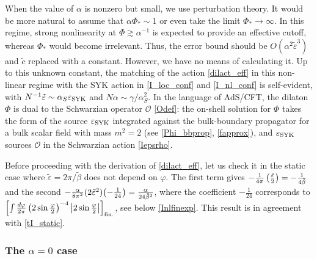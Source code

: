 \documentclass[12pt]{article}
\newcommand{\OO}{\mathcal{O}}
\newcommand{\al}{\alpha}
\newcommand{\ga}{\gamma}
\newcommand{\vep}{\varepsilon}
\newcommand{\tvep}{\tilde{\varepsilon}}
\newcommand{\vp}{\varphi}
\newcommand{\ov}{\over}
\begin{document}
When the value of $\alpha$ is nonzero but small, we use perturbation theory. It would be more natural to assume that $\alpha\Phi_*\sim 1$ or even take the limit $\Phi_*\to\infty$. In this regime, strong nonlinearity at $\Phi\gtrsim\alpha^{-1}$ is expected to provide an effective cutoff, whereas $\Phi_*$ would become irrelevant. Thus, the error bound should be $O(\alpha^{2}\tvep^3)$ and $\tilde{c}$ replaced with a constant. However, we have no means of calculating it. Up to this unknown constant, the matching of the action \eqref{dilact_eff} in this non-linear regime with the SYK action in \eqref{I_loc_conf} and \eqref{I_nl_conf} is self-evident, with $N^{-1}\tvep \sim \al_S \vep_{\rm{SYK}}$ and $N \al \sim \ga/\al_S^2$. In the language of AdS/CFT, the dilaton $\Phi$ is dual to the Schwarzian operator $\OO$ \eqref{Odef}: the on-shell solution for $\Phi$ takes the form of the source $\vep_{\rm{SYK}}$ integrated against the bulk-boundary propagator for a bulk scalar field with mass $m^2=2$ (see \eqref{Phi_bbprop}, \eqref{fapprox}), and $\vep_{\rm{SYK}}$ sources $\OO$ in the Schwarzian action \eqref{Iepsrho}. 

Before proceeding with the derivation of \eqref{dilact_eff}, let us check it in the static case where $\tvep=2\pi/\tilde{\beta}$ does not depend on $\vp$. The first term gives $-\frac{1}{4\pi}\left({\tvep \ov 2}\right)=-{1 \ov 4\tilde{\beta}}$ and the second $-\frac{\alpha}{8\pi^2}(2\tvep^2)\bigl(-\frac{1}{24}\bigr) ={\alpha \ov 24\tilde{\beta}^2}$, where the coefficient $-\frac{1}{24}$ corresponds to $\left[\int{d\vp \ov 2 \pi}\left(2 \sin{\vp \ov 2}\right)^{-4}\abs{2 \sin{\vp \ov 2}}\right]_{\text{fin.}}$, see below \eqref{Inlfinexp}. This result is in agreement with \eqref{tI_static}.



\subsubsection{The $\alpha=0$ case}
\end{document}
